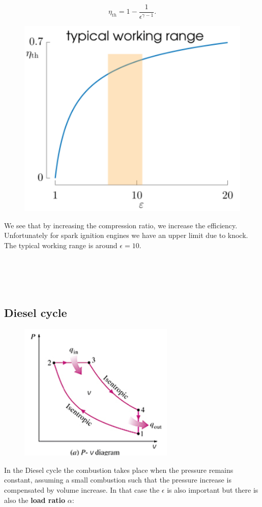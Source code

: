 	\begin{equation}
	\eta _{th} = 1 - \frac{1}{\epsilon ^{\gamma -1}}.
	\end{equation}	 
	
	\begin{figure}
	\vspace{-5mm}
	\includegraphics[scale=0.5]{ch2/12}
	\label{fig:2.12}
	\end{figure}
	We see that by increasing the compression ratio, we increase the efficiency. Unfortunately for spark ignition engines we have an upper limit due to knock. The typical working range is around $\epsilon = 10$. 	\\\\\\\\\\
	
\subsection{Diesel cycle}
	\begin{figure}
	\vspace{-5mm}
	\includegraphics[scale=0.75]{ch2/13}
	\label{fig:2.13}
	\end{figure}
	In the Diesel cycle the combustion takes place when the pressure remains constant, assuming a small combustion such that the pressure increase is compensated by volume increase. In that case the $\epsilon$ is also important but there is also the \textbf{load ratio} $\alpha$:
	
